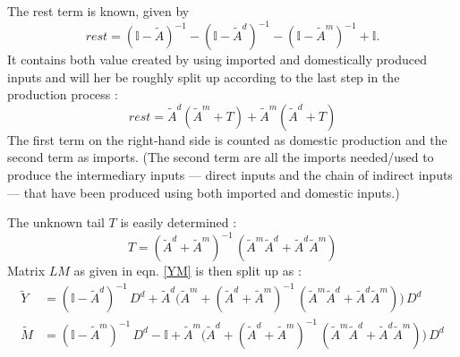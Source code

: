 \documentclass[12pt,english]{article}
\newcommand{\mli}[1]{\mathit{#1}}
\begin{document}
The rest term is known, given by $$ rest =(\mathbb{I} - \tilde{A})^{-1} - (\mathbb{I} - \tilde{A}^d)^{-1} - (\mathbb{I} - \tilde{A}^m)^{-1} + \mathbb{I}.$$
It contains both value created by using imported and domestically produced inputs and will her be roughly split up according to the last step in the production process :
$$
rest = \tilde{A}^d (\tilde{A}^m + T) + \tilde{A}^m(\tilde{A}^d + T)
$$
The first term on the right-hand side is counted as domestic production and the second term as imports. (The second term are all the imports needed/used to produce the intermediary inputs --- direct inputs and the chain of indirect inputs --- that have been produced using both imported and domestic inputs.)

The unknown tail $T$ is easily determined : $$ T = ( \tilde{A}^d +  \tilde{A}^m)^{-1}\, ( \tilde{A}^m  \tilde{A}^d +  \tilde{A}^d \tilde{A}^m)$$
Matrix $\mli{LM}$ as given in eqn. \ref{YM} is then split up as :
\begin{align}
\tilde{Y} &= (\mathbb{I} - \tilde{A}^d)^{-1} \, D^d + \tilde{A}^d \big(\tilde{A}^m +  ( \tilde{A}^d +  \tilde{A}^m)^{-1}\, ( \tilde{A}^m  \tilde{A}^d +  \tilde{A}^d \tilde{A}^m)\big) \, D^d \\
\tilde{M} &= (\mathbb{I} - \tilde{A}^m)^{-1} \, D^d - \mathbb{I} + \tilde{A}^m \big(\tilde{A}^d +  ( \tilde{A}^d +  \tilde{A}^m)^{-1}\, ( \tilde{A}^m  \tilde{A}^d +  \tilde{A}^d \tilde{A}^m)\big) \, D^d
\end{align}




\end{document}

